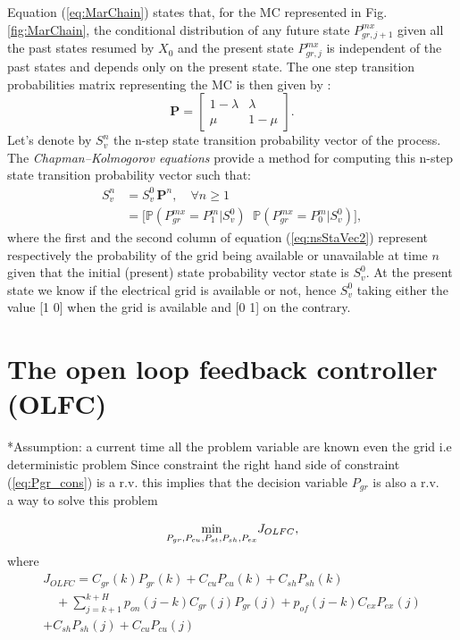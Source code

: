 \documentclass{ifacconf}
\begin{document}
Equation (\ref{eq:MarChain}) states that, for the MC represented in Fig. \ref{fig:MarChain}, the conditional distribution of any future state $P^{mx}_{gr,j+1}$ given all the past states resumed by $X_0$ and the present state $P^{mx}_{gr,j}$ is independent of the past states and
depends only on the present state. The one step transition probabilities matrix representing the MC is then given by : 
\begin{equation}\label{eq:MarChain_TransMat}
\mathbf{P} = 
  \begin{bmatrix}
 1-\lambda  & \lambda \\ 
 \mu & 1- \mu
\end{bmatrix} . 
\end{equation}
Let's denote by $S_v^n$ the n-step state transition probability vector of the process. The \textit{Chapman–Kolmogorov equations} provide a method for computing this n-step state transition probability vector such that: 
\begin{subequations}
    \begin{align}
    S_v^n & = S_v^0 \, \mathbf{P}^n, \quad \forall n \geq 1 \label{eq:nsStaVec1} \\
          & = \bigl[ \mathbb{P} (P_{gr}^{mx} = P_1^m | S_v^0)\;\;\mathbb{P} (P_{gr}^{mx} = P_0^m | S_v^0) \bigl] \label{eq:nsStaVec2},
\end{align}
\end{subequations}
where the first and the second column of equation (\ref{eq:nsStaVec2}) represent respectively the probability of the grid being available or unavailable at time $n$ given that the initial (present) state probability vector state is $S^0_v$. At the present state we know if the electrical grid is available or not, hence $S^0_v$ taking either the value [1 0] when the grid is available and [0 1] on the contrary.

 \section{The open loop feedback controller (OLFC)}
 *Assumption: a current time all the problem variable are known even the grid i.e deterministic problem 
 Since constraint the right hand side of constraint (\ref{eq:Pgr_cons}) is  a r.v. this implies that the decision variable $P_{gr}$ is also a r.v. \\
 a way to solve this problem 
 
\begin{equation}\label{eq:Stosys}
    \underset{P_{gr},P_{cu},P_{st},P_{sh},P_{ex}}{\hspace{10px} \text{min} \hspace{10px}}  J_{OLFC},
\end{equation}
where
\begin{multline}
    J_{OLFC}  = C_{gr}(k)P_{gr}(k) + C_{cu}P_{cu}(k)+ C_{sh}P_{sh}(k) \\
                  \quad + \sum_{j=k+1}^{k+H} p_{on}(j-k)C_{gr}(j)P_{gr}(j)+p_{of}(j-k)C_{ex}P_{ex}(j) \\ + C_{sh}P_{sh}(j)+ C_{cu}P_{cu}(j)
\end{multline}
\end{document}
